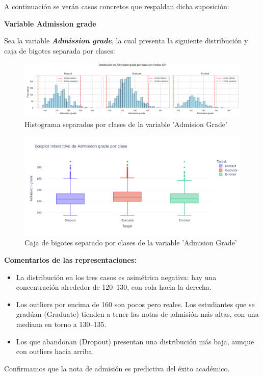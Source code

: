 \documentclass{report}[14pt]
\begin{document}
A continuación se verán casos concretos que respaldan dicha suposición:


\textbf{Variable Admission grade}

Sea la variable \textbf{\textit{Admission grade}}, la cual presenta la siguiente distribución y caja de bigotes separada por clases:
\begin{figure}
    \centering
    \includegraphics[width=0.75\linewidth]{distribution/Admission grade_distribution.png}
    \caption{Histograma separados por clases de la variable 'Admision Grade'}
    \label{fig:admisiongrade-label}
\end{figure}

\begin{figure}
    \centering
    \includegraphics[width=0.75\linewidth]{distribution_plotly/admission_grade.png}
    \caption{Caja de bigotes separado por clases de la variable 'Admision Grade'}
    \label{fig:enter-label}
\end{figure}
\FloatBarrier
\textbf{Comentarios de las representaciones:}
\begin{itemize}
    \item La distribución en los tres casos es asimétrica negativa: hay una concentración alrededor de 120–130, con cola hacia la derecha.
    
    \item Los outliers por encima de 160 son pocos pero reales. Los estudiantes que se gradúan (Graduate) tienden a tener las notas de admisión más altas, con una mediana en torno a 130–135.
    
    \item Los que abandonan (Dropout) presentan una distribución más baja, aunque con outliers hacia arriba.
\end{itemize}
Confirmamos que la nota de admisión es predictiva del éxito académico.
\end{document}
